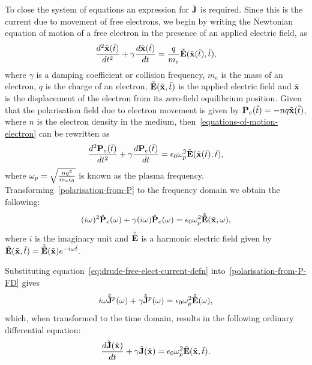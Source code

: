 To close the system of equations an expression for $\tilde{\mathbf{J}}$ is required. Since this is the current due to movement of free electrons, we begin by writing the Newtonian equation of motion of a free electron in the presence of an applied electric field, as
\begin{equation}
\frac{d^2 \tilde{\mathbf{x}}(\tilde{t}) }{dt^2}+ \gamma \frac{d \tilde{\mathbf{x}}(\tilde{t}) }{dt}= \frac{q}{m_e}\tilde{\mathbf{E}}(\tilde{\mathbf{x}}(\tilde{t}),\tilde{t}),
\label{equations-of-motion-electron}
\end{equation}
where $\gamma$ is a damping coefficient or collision frequency, $m_e$ is the mass of an electron, $q$ is the charge of an electron, $\tilde{\mathbf{E}}(\tilde{\mathbf{x}},\tilde{t})$ is the applied electric field and $\tilde{\mathbf{x}}$ is the displacement of the electron from its zero-field equilibrium position. Given that the polarisation field due to electron movement is given by $ \mathbf{P}_e(\tilde{t}) = - n q \tilde{\mathbf{x}}(\tilde{t})$, where $n$ is the electron density in the medium, then~\eqref{equations-of-motion-electron} can be rewritten as
\begin{equation}
\label{polarisation-from-P}
\frac{d^2 \mathbf{P}_e(\tilde{t}) }{dt^2} + \gamma \frac{d \mathbf{P}_e(\tilde{t}) }{dt} = \epsilon_0 \omega_p^2 \tilde{\mathbf{E}}(\tilde{\mathbf{x}}(\tilde{t}),\tilde{t}),
\end{equation}
where $\omega_p = \sqrt{\frac{n q^2}{m_e \epsilon_0}}$ is known as the plasma frequency.
%
Transforming~\eqref{polarisation-from-P} to the frequency domain we obtain the following:
\begin{equation}
\label{polarisation-from-P-FD}
( i \omega )^2 \hat{\mathbf{P}}_e(\omega) + \gamma (i \omega) \hat{\mathbf{P}}_e(\omega) = \epsilon_0 \omega_p^2 \hat{\tilde{\mathbf{E}}}(\tilde{\mathbf{x}},\omega),
\end{equation}
where $i$ is the imaginary unit and $\hat{\tilde{\mathbf{E}}}$ is a harmonic electric field given by $\tilde{\mathbf{E}}(\tilde{\mathbf{x}},\tilde{t}) = \hat{\tilde{\mathbf{E}}}(\tilde{\mathbf{x}}) e^{- i \omega \tilde{t} }$.

Substituting equation~\eqref{eq:drude-free-elect-current-defn} into~\eqref{polarisation-from-P-FD} gives
\begin{equation}
    \label{eq:pol-current-freq-domain}
  i \omega \hat{\tilde{\mathbf{J}}}^p(\omega) + \gamma \hat{\tilde{\mathbf{J}}}^p(\omega) = \epsilon_0 \omega_p^2 \hat{\tilde{\mathbf{E}}}(\omega) ,
\end{equation}
which, when transformed to the time domain, results in the following ordinary differential equation:
\begin{equation}
  \frac{d \tilde{\mathbf{J}}(\tilde{\mathbf{x}})}{dt} + \gamma \tilde{\mathbf{J}}(\tilde{\mathbf{x}}) = \epsilon_0 \omega_p^2 \tilde{\mathbf{E}}(\tilde{\mathbf{x}},\tilde{t}).
  \label{pol-current-ADE}
\end{equation}

